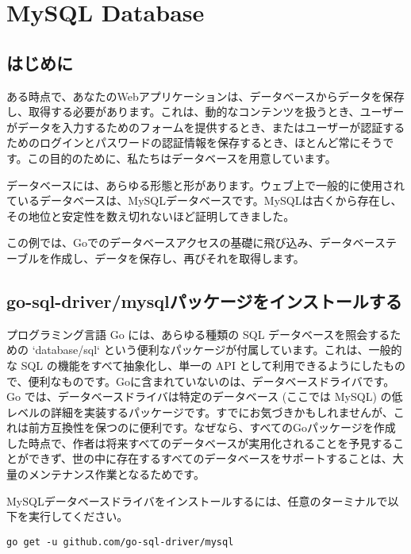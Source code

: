 \section{MySQL Database}

\subsection{はじめに}

ある時点で、あなたのWebアプリケーションは、データベースからデータを保存し、取得する必要があります。これは、動的なコンテンツを扱うとき、ユーザーがデータを入力するためのフォームを提供するとき、またはユーザーが認証するためのログインとパスワードの認証情報を保存するとき、ほとんど常にそうです。この目的のために、私たちはデータベースを用意しています。

データベースには、あらゆる形態と形があります。ウェブ上で一般的に使用されているデータベースは、MySQLデータベースです。MySQLは古くから存在し、その地位と安定性を数え切れないほど証明してきました。

この例では、Goでのデータベースアクセスの基礎に飛び込み、データベーステーブルを作成し、データを保存し、再びそれを取得します。

\subsection{go-sql-driver/mysqlパッケージをインストールする}

プログラミング言語 Go には、あらゆる種類の SQL データベースを照会するための `database/sql` という便利なパッケージが付属しています。これは、一般的な SQL の機能をすべて抽象化し、単一の API として利用できるようにしたもので、便利なものです。Goに含まれていないのは、データベースドライバです。Go では、データベースドライバは特定のデータベース (ここでは MySQL) の低レベルの詳細を実装するパッケージです。すでにお気づきかもしれませんが、これは前方互換性を保つのに便利です。なぜなら、すべてのGoパッケージを作成した時点で、作者は将来すべてのデータベースが実用化されることを予見することができず、世の中に存在するすべてのデータベースをサポートすることは、大量のメンテナンス作業となるためです。

MySQLデータベースドライバをインストールするには、任意のターミナルで以下を実行してください。


\begin{lstlisting}[numbers=none]
go get -u github.com/go-sql-driver/mysql
\end{lstlisting}



